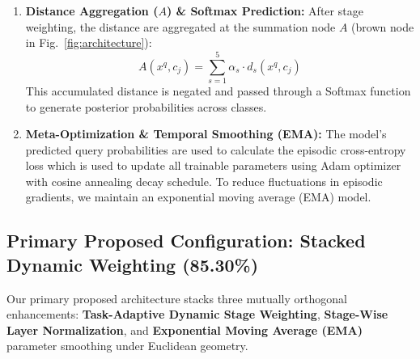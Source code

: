 \documentclass[conference]{IEEEtran}
\begin{document}
\begin{enumerate}
    \item \textbf{Distance Aggregation ($A$) \& Softmax Prediction:} After stage weighting, the distance are aggregated at the summation node $A$ (brown node in Fig.~\ref{fig:architecture}):
    \begin{equation}
        A(x^q, c_j) = \sum_{s=1}^5 \alpha_s \cdot d_s(x^q, c_j)
    \end{equation}
    This accumulated distance is negated and passed through a Softmax function to generate posterior probabilities across classes.
    \item \textbf{Meta-Optimization \& Temporal Smoothing (EMA):} The model's predicted query probabilities are used to calculate the episodic cross-entropy loss which is used to update all trainable parameters using Adam optimizer with cosine annealing decay schedule. To reduce fluctuations in episodic gradients, we maintain an exponential moving average (EMA) model.
\end{enumerate}

\subsection{Primary Proposed Configuration: Stacked Dynamic Weighting (85.30\%)}
Our primary proposed architecture stacks three mutually orthogonal enhancements: \textbf{Task-Adaptive Dynamic Stage Weighting}, \textbf{Stage-Wise Layer Normalization}, and \textbf{Exponential Moving Average (EMA)} parameter smoothing under Euclidean geometry.
\end{document}
